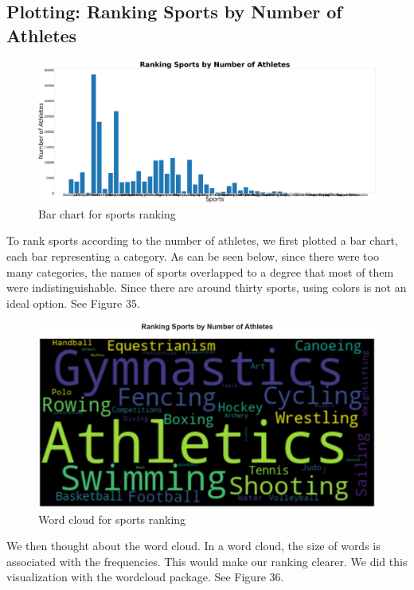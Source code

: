 \documentclass[12pt]{article}
\begin{document}
\subsection{Plotting: Ranking Sports by Number of Athletes}
\begin{figure}[!b]
    \centering
    \includegraphics[angle=270, scale=0.055]{pics/g-4-1.png}
    \caption{Bar chart for sports ranking}
    \label{fig:my_label}
\end{figure}
To rank sports according to the number of athletes, we first plotted a bar chart, each bar representing a category. As can be seen below, since there were too many categories, the names of sports overlapped to a degree that most of them were indistinguishable. Since there are around thirty sports, using colors is not an ideal option. See Figure 35.
\begin{figure}[!t]
    \centering
    \includegraphics[scale=0.33]{pics/g-4-2.png}
    \caption{Word cloud for sports ranking}
    \label{fig:my_label}
\end{figure}

We then thought about the word cloud. In a word cloud, the size of words is associated with the frequencies. This would make our ranking clearer. We did this visualization with the wordcloud package. See Figure 36.
\end{document}
